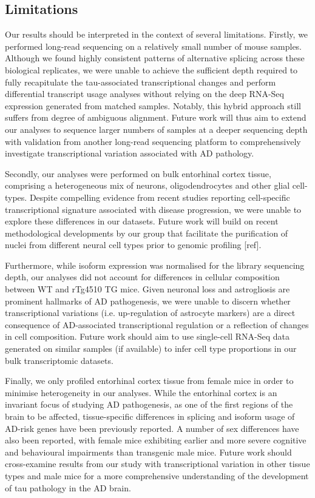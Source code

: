 \subsection{Limitations}
Our results should be interpreted in the context of several limitations. Firstly, we performed long-read sequencing on a relatively small number of mouse samples. Although we found highly consistent patterns of alternative splicing across these biological replicates, we were unable to achieve the sufficient depth required to fully recapitulate the tau-associated transcriptional changes and perform differential transcript usage analyses without relying on the deep RNA-Seq expression generated from matched samples. Notably, this hybrid approach still suffers from degree of ambiguous alignment. Future work will thus aim to extend our analyses to sequence larger numbers of samples at a deeper sequencing depth with validation from another long-read sequencing platform to comprehensively investigate transcriptional variation associated with AD pathology. 

Secondly, our analyses were performed on bulk entorhinal cortex tissue, comprising a heterogeneous mix of neurons, oligodendrocytes and other glial cell-types. Despite compelling evidence from recent studies reporting cell-specific transcriptional signature associated with disease progression, we were unable to explore these differences in our datasets. Future work will build on recent methodological developments by our group that facilitate the purification of nuclei from different neural cell types prior to genomic profiling [ref].

Furthermore, while isoform expression was normalised for the library sequencing depth, our analyses did not account for differences in cellular composition between WT and rTg4510 TG mice. Given neuronal loss and astrogliosis are prominent hallmarks of AD pathogenesis, we were unable to discern whether transcriptional variations (i.e. up-regulation of astrocyte markers) are a direct consequence of AD-associated transcriptional regulation or a reflection of changes in cell composition. Future work should aim to use single-cell RNA-Seq data generated on similar samples (if available) to infer cell type proportions in our bulk transcriptomic datasets. 

Finally, we only profiled entorhinal cortex tissue from female mice in order to minimise heterogeneity in our analyses. While the entorhinal cortex is an invariant focus of studying AD pathogenesis, as one of the first regions of the brain to be affected, tissue-specific differences in splicing and isoform usage of AD-risk genes have been previously reported\cite{Monti2021}. A number of sex differences have also been reported, with female mice exhibiting earlier and more severe cognitive and behavioural impairments than transgenic male mice\cite{M2011}. Future work should cross-examine results from our study with transcriptional variation in other tissue types and male mice for a more comprehensive understanding of the development of tau pathology in the AD brain. 

